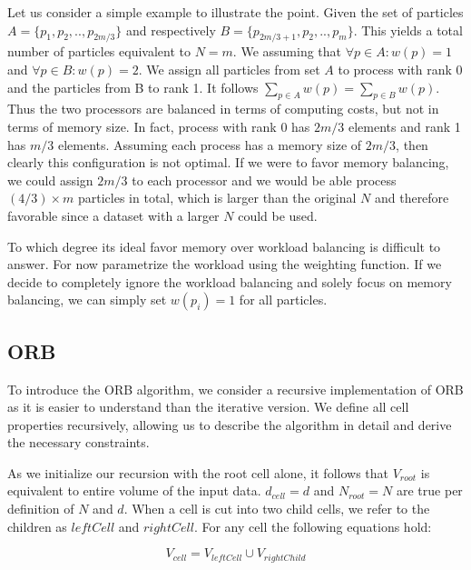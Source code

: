 \documentclass[]{article}
\begin{document}
Let us consider a simple example to illustrate the point. Given the set of particles $A = \{p_1, p_2, .., p_{2m/3}\}$ and respectively $B = \{p_{2m/3 + 1}, p_2, .., p_{m}\}$. This yields a total number of particles equivalent to $N = m$. We assuming that $\forall p \in A : w(p) = 1$ and $\forall p \in B : w(p) = 2$. 
We assign all particles from set $A$ to process with rank 0 and the particles from B to rank 1. It follows $\sum_{p\in A} w(p) = \sum_{p\in B} w(p)$. Thus the two processors are balanced in terms of computing costs, but not in terms of memory size. In fact, process with rank 0 has $2m/3$ elements and rank 1 has $m/3$ elements. Assuming each process has a memory size of $2m/3$, then clearly this configuration is not optimal. If we were to favor memory balancing, we could assign $2m/3$ to each processor and we would be able process $(4/3) \times m$ particles in total, which is larger than the original $N$ and therefore favorable since a dataset with a larger $N$ could be used.

To which degree its ideal favor memory over workload balancing is difficult to answer. For now parametrize the workload using the weighting function. If we decide to completely ignore the workload balancing and solely focus on memory balancing, we can simply set $w(p_i) = 1$ for all particles.

\subsection{ORB}


To introduce the ORB algorithm, we consider a recursive implementation of ORB as it is easier to understand than the iterative version. We define all cell properties recursively, allowing us to describe the algorithm in detail and derive the necessary constraints.

As we initialize our recursion with the root cell alone, it follows that $V_{root}$ is equivalent to entire volume of the input data. $d_{cell} = d$ and $N_{root} = N$ are true per definition of $N$ and $d$. 
When a cell is cut into two child cells, we refer to the children as $leftCell$ and $rightCell$. For any cell the following equations hold:

\begin{center}
	\begin{equation}\label{eq:v}
		V_{cell} = V_{leftCell} \cup V_{rightChild}
	\end{equation}
\end{center}
\end{document}
